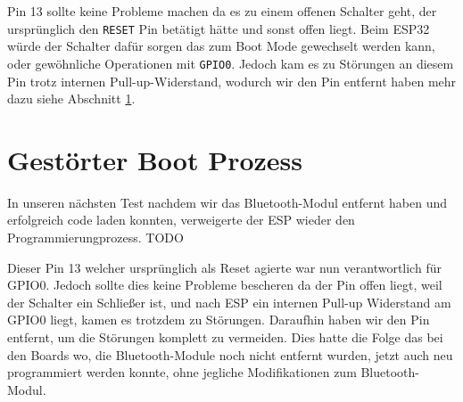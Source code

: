 Pin 13 sollte keine Probleme machen da es zu einem offenen Schalter geht,
der ursprünglich den \texttt{RESET} Pin betätigt hätte und sonst offen liegt. 
Beim ESP32 würde der Schalter dafür sorgen das zum Boot Mode gewechselt werden kann, 
oder gewöhnliche Operationen mit \texttt{GPIO0}. 
Jedoch kam es zu Störungen an diesem Pin trotz internen Pull-up-Widerstand, 
wodurch wir den Pin entfernt haben mehr dazu siehe Abschnitt \ref{subsec:gestoert_boot}.


\section{Gestörter Boot Prozess} \label{subsec:gestoert_boot}
In unseren nächsten Test nachdem wir das Bluetooth-Modul entfernt haben 
und erfolgreich code laden konnten, verweigerte der ESP wieder den Programmierungprozess.
TODO

Dieser Pin 13 welcher ursprünglich als Reset agierte war nun verantwortlich für GPIO0. 
Jedoch sollte dies keine Probleme bescheren da der Pin offen liegt, weil der Schalter ein Schließer ist,
und nach ESP ein internen Pull-up Widerstand am GPIO0 liegt, kamen es trotzdem zu Störungen.
Daraufhin haben wir den Pin entfernt, um die Störungen komplett zu vermeiden. 
Dies hatte die Folge das bei den Boards wo, die Bluetooth-Module noch nicht entfernt wurden,
jetzt auch neu programmiert werden konnte, ohne jegliche Modifikationen zum Bluetooth-Modul.
